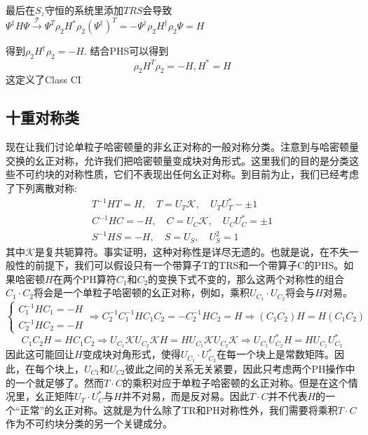 \documentclass{article}
\numberwithin{equation}{subsection}
\newcommand{\mT}{\mathcal{T}}
\begin{document}
最后在$S_z$守恒的系统里添加$TRS$会导致$\Psi^\dagger H\Psi\xrightarrow{\mT}\Psi^T\rho_2H^*\rho_2(\Psi^\dagger)^T=-\Psi^\dagger\rho_2 H^\dagger\rho_2\Psi=H$

得到$\rho_2H^\dagger\rho_2=-H$. 结合PHS可以得到
\begin{equation}
    \rho_2 H^T\rho_2=-H,H^*=H
\end{equation}
这定义了Class CI
\subsection{十重对称类}
现在让我们讨论单粒子哈密顿量的非幺正对称的一般对称分类。注意到与哈密顿量交换的幺正对称，允许我们把哈密顿量变成块对角形式。这里我们的目的是分类这些不可约块的对称性质，它们不表现出任何幺正对称。到目前为止，我们已经考虑了下列离散对称: 
\begin{equation}
    \begin{split}
        T^{-1}HT=H,\quad T=U_T\mathcal{K},\quad U_TU_T^*-\pm 1\\
        C^{-1}HC=-H,\quad C=U_C\mathcal{K},\quad U_CU_C^*=\pm 1\\
        S^{-1}HS=-H,\quad S=U_S,\quad U_S^2=1
    \end{split}
\end{equation}
其中$\mathcal{K}$是复共轭算符。事实证明，这种对称性是详尽无遗的。也就是说，在不失一般性的前提下，我们可以假设只有一个带算子T的TRS和一个带算子C的PHS。如果哈密顿$H$在两个PH算符$C_1$和$C_2$的变换下式不变的，那么这两个对称性的组合$C_1\cdot C_2$将会是一个单粒子哈密顿的幺正对称，例如，乘积$U_{C_1}\cdot U_{C_2}$将会与$H$对易。
\begin{equation}
    \begin{cases}
        C_1^{-1}HC_1=-H\\
        C_2^{-1}HC_2=-H
    \end{cases}\Rightarrow C_2^{-1}C_1^{-1}HC_1C_2=-C_2^{-1}HC_2=H\Rightarrow (C_1C_2)H=H(C_1C_2)
\end{equation}
\begin{equation}
    C_1C_2H=HC_1C_2\Rightarrow U_{C_1}\mathcal{K}U_{C_2}\mathcal{K}H=HU_{C_1}\mathcal{K}U_{C_2}\mathcal{K}\Rightarrow U_{C_1}U_{C_2}^*H=HU_{C_1}U_{C_2}^*
\end{equation}
因此这可能回让$H$变成块对角形式，使得$U_{C_1}\cdot U_{C_2}^*$在每一个块上是常数矩阵。因此，在每个块上，$U_{C1}$和$U_{C2}$彼此之间的关系无关紧要，因此只考虑两个PH操作中的一个就足够了。然而$T\cdot C$的乘积对应于单粒子哈密顿的幺正对称。但是在这个情况里，幺正矩阵$U_T\cdot U_C^*$与$H$并不对易，而是反对易。因此$T\cdot C$并不代表$H$的一个“正常”的幺正对称。这就是为什么除了TR和PH对称性外，我们需要将乘积$T\cdot C$作为不可约块分类的另一个关键成分。
\end{document}
